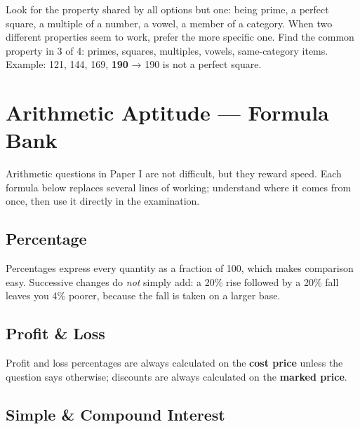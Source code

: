 Look for the property shared by all options but one: being prime, a perfect square, a multiple of a number,
a vowel, a member of a category. When two different properties seem to work, prefer the more specific one.
Find the common property in 3 of 4: primes, squares, multiples, vowels, same-category items.
Example: 121, 144, 169, \textbf{190} → 190 is not a perfect square.

\needspace{191pt}

\hypertarget{p1-05--5-arithmetic-aptitude--formula-bank}{%
\section{Arithmetic Aptitude --- Formula Bank}\label{p1-05--5-arithmetic-aptitude--formula-bank}}

Arithmetic questions in Paper I are not difficult, but they reward speed. Each formula below replaces several
lines of working; understand where it comes from once, then use it directly in the examination.

\needspace{125pt}

\hypertarget{p1-05--percentage}{%
\subsection{Percentage}\label{p1-05--percentage}}

Percentages express every quantity as a fraction of 100, which makes comparison easy. Successive changes do
\emph{not} simply add: a 20\% rise followed by a 20\% fall leaves you 4\% poorer, because the fall is taken on a
larger base.



\needspace{125pt}

\hypertarget{p1-05--profit--loss}{%
\subsection{Profit \& Loss}\label{p1-05--profit--loss}}

Profit and loss percentages are always calculated on the \textbf{cost price} unless the question says otherwise;
discounts are always calculated on the \textbf{marked price}.



\needspace{125pt}

\hypertarget{p1-05--simple--compound-interest}{%
\subsection{Simple \& Compound Interest}\label{p1-05--simple--compound-interest}}

